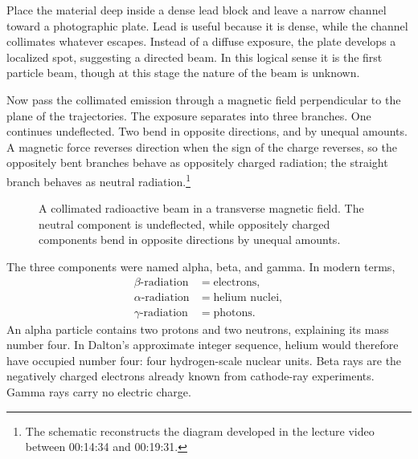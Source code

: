 Place the material deep inside a dense lead block and leave a narrow channel toward a photographic plate. Lead is useful because it is dense, while the channel collimates whatever escapes. Instead of a diffuse exposure, the plate develops a localized spot, suggesting a directed beam. In this logical sense it is the first particle beam, though at this stage the nature of the beam is unknown.

Now pass the collimated emission through a magnetic field perpendicular to the plane of the trajectories. The exposure separates into three branches. One continues undeflected. Two bend in opposite directions, and by unequal amounts. A magnetic force reverses direction when the sign of the charge reverses, so the oppositely bent branches behave as oppositely charged radiation; the straight branch behaves as neutral radiation.\footnote{The schematic reconstructs the diagram developed in the lecture video between 00:14:34 and 00:19:31.}

\begin{figure}[h]
\centering
{}
\caption{A collimated radioactive beam in a transverse magnetic field. The neutral component is undeflected, while oppositely charged components bend in opposite directions by unequal amounts.}
\end{figure}

The three components were named alpha, beta, and gamma. In modern terms,
\begin{equation}
\begin{aligned}
\beta\text{-radiation} &= \text{electrons},\\
\alpha\text{-radiation} &= \text{helium nuclei},\\
\gamma\text{-radiation} &= \text{photons}.
\end{aligned}
\end{equation}
An alpha particle contains two protons and two neutrons, explaining its mass number four. In Dalton's approximate integer sequence, helium would therefore have occupied number four: four hydrogen-scale nuclear units. Beta rays are the negatively charged electrons already known from cathode-ray experiments. Gamma rays carry no electric charge.

